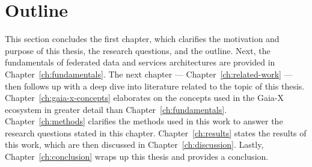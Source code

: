 \section{Outline}\label{sec:outline}

This section concludes the first chapter, which clarifies the motivation and purpose of this thesis, the research questions, and the outline.
Next, the fundamentals of federated data and services architectures are provided in Chapter~\ref{ch:fundamentals}.
The next chapter --- Chapter~\ref{ch:related-work} --- then follows up with a deep dive into literature related to the topic of this thesis.
Chapter~\ref{ch:gaia-x-concepts} elaborates on the concepts used in the Gaia-X ecosystem in greater detail than Chapter~\ref{ch:fundamentals}.
Chapter~\ref{ch:methods} clarifies the methods used in this work to answer the research questions stated in this chapter.
Chapter~\ref{ch:results} states the results of this work, which are then discussed in Chapter~\ref{ch:discussion}.
Lastly, Chapter~\ref{ch:conclusion} wraps up this thesis and provides a conclusion.

